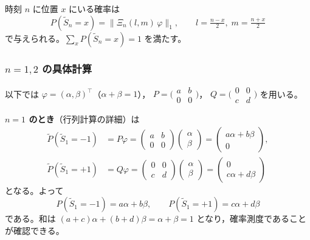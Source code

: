 \documentclass[a4j,dvipdfmx]{jsarticle}
\theoremstyle{plainnote}
\begin{document}
時刻 $n$ に位置 $x$ にいる確率は
\begin{equation}
  P(\tilde{S}_n = x) = \|\Xi_n(l,m)\,\varphi\|_1,
  \qquad l = \tfrac{n-x}{2},\; m = \tfrac{n+x}{2}
  \label{eq:crw_Xi}
\end{equation}
で与えられる。$\displaystyle\sum_{x} P(\tilde{S}_n = x) = 1$ を満たす。

\subsubsection*{$n = 1, 2$ の具体計算}

以下では $\varphi = (\alpha, \beta)^\top$（$\alpha + \beta = 1$），
$P = \bigl(\begin{smallmatrix}a&b\\0&0\end{smallmatrix}\bigr)$，
$Q = \bigl(\begin{smallmatrix}0&0\\c&d\end{smallmatrix}\bigr)$ を用いる。

\medskip
\noindent\textbf{$n=1$ のとき}（行列計算の詳細）は
\begin{align*}
  \widetilde{P}(\tilde{S}_1 = -1)
    &= P\varphi
     = \begin{pmatrix} a & b \\ 0 & 0 \end{pmatrix}
       \begin{pmatrix} \alpha \\ \beta \end{pmatrix}
     = \begin{pmatrix} a\alpha + b\beta \\ 0 \end{pmatrix}, \\[4pt]
  \widetilde{P}(\tilde{S}_1 = +1)
    &= Q\varphi
     = \begin{pmatrix} 0 & 0 \\ c & d \end{pmatrix}
       \begin{pmatrix} \alpha \\ \beta \end{pmatrix}
     = \begin{pmatrix} 0 \\ c\alpha + d\beta \end{pmatrix}
\end{align*}
となる。よって
\[
  P(\tilde{S}_1 = -1) = a\alpha + b\beta, \qquad P(\tilde{S}_1 = +1) = c\alpha + d\beta
\]
である。和は $(a+c)\alpha + (b+d)\beta = \alpha + \beta = 1$ となり，確率測度であることが確認できる。
\end{document}
